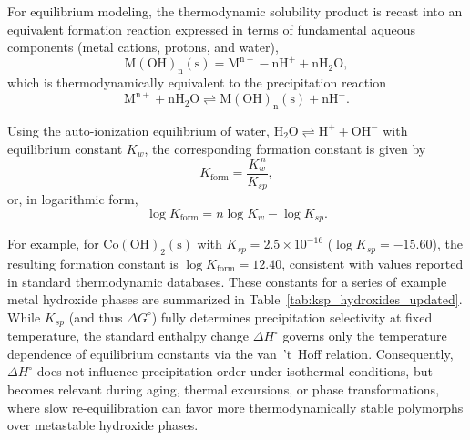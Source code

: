 \documentclass[final,2p,times]{elsarticle}
\begin{document}
For equilibrium modeling, the thermodynamic solubility product is recast into an equivalent formation reaction expressed in terms of fundamental aqueous components (metal cations, protons, and water),
\begin{equation}
\mathrm{M(OH)_n(s) = M^{n+} - nH^+ + nH_2O},
\end{equation}
which is thermodynamically equivalent to the precipitation reaction
\begin{equation}
\mathrm{M^{n+} + nH_2O \rightleftharpoons M(OH)_n(s) + nH^+}.
\end{equation}

Using the auto-ionization equilibrium of water, $\mathrm{H_2O \rightleftharpoons H^+ + OH^-}$ with equilibrium constant $K_w$, the corresponding formation constant is given by
\begin{equation}
K_{\mathrm{form}} = \frac{K_w^{\,n}}{K_{sp}},
\end{equation}
or, in logarithmic form,
\begin{equation}
\log K_{\mathrm{form}} = n \log K_w - \log K_{sp}.
\end{equation}

For example, for $\mathrm{Co(OH)_2(s)}$ with $K_{sp}=2.5\times10^{-16}$ ($\log K_{sp}=-15.60$), the resulting formation constant is $\log K_{\mathrm{form}}=12.40$, consistent with values reported in standard thermodynamic databases. These constants for a series of example metal hydroxide phases are summarized in Table~\ref{tab:ksp_hydroxides_updated}. While $K_{sp}$ (and thus $\Delta G^\circ$) fully determines precipitation selectivity at fixed temperature, the standard enthalpy change $\Delta H^\circ$ governs only the temperature dependence of equilibrium constants via the van~’t~Hoff relation. Consequently, $\Delta H^\circ$ does not influence precipitation order under isothermal conditions, but becomes relevant during aging, thermal excursions, or phase transformations, where slow re-equilibration can favor more thermodynamically stable polymorphs over metastable hydroxide phases.


\renewcommand{\thetable}{A\arabic{table}}
\setcounter{table}{0}
\end{document}
